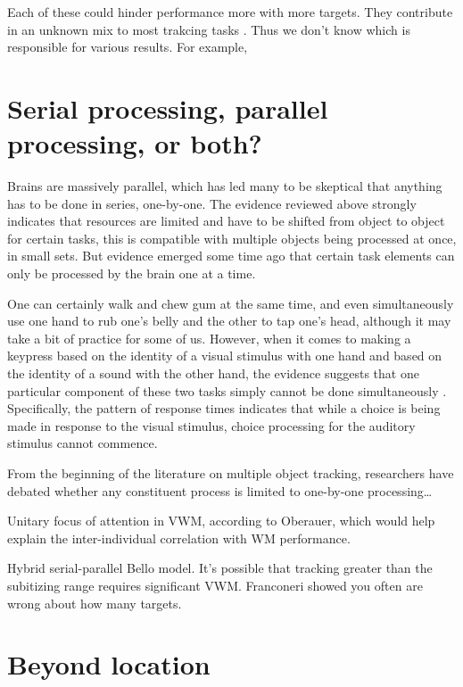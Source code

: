 \documentclass[]{book}
\begin{document}
Each of these could hinder performance more with more targets. They contribute in an unknown mix to most trakcing tasks .
Thus we don't know which is responsible for various results. For example,

\hypertarget{serial-processing-parallel-processing-or-both}{%
\chapter{Serial processing, parallel processing, or both?}\label{serial-processing-parallel-processing-or-both}}

Brains are massively parallel, which has led many to be skeptical that anything has to be done in series, one-by-one. The evidence reviewed above strongly indicates that resources are limited and have to be shifted from object to object for certain tasks, this is compatible with multiple objects being processed at once, in small sets. But evidence emerged some time ago that certain task elements can only be processed by the brain one at a time.

One can certainly walk and chew gum at the same time, and even simultaneously use one hand to rub one's belly and the other to tap one's head, although it may take a bit of practice for some of us. However, when it comes to making a keypress based on the identity of a visual stimulus with one hand and based on the identity of a sound with the other hand, the evidence suggests that one particular component of these two tasks simply cannot be done simultaneously \citet{pashlerDualtaskInterferenceSimple1994}. Specifically, the pattern of response times indicates that while a choice is being made in response to the visual stimulus, choice processing for the auditory stimulus cannot commence.

From the beginning of the literature on multiple object tracking, researchers have debated whether any constituent process is limited to one-by-one processing\ldots{}

Unitary focus of attention in VWM, according to Oberauer, which would help explain the inter-individual correlation with WM performance.

Hybrid serial-parallel Bello model.
It's possible that tracking greater than the subitizing range requires significant VWM. Franconeri showed you often are wrong about how many targets.

\hypertarget{beyondLocation}{%
\chapter{Beyond location}\label{beyondLocation}}
\end{document}
